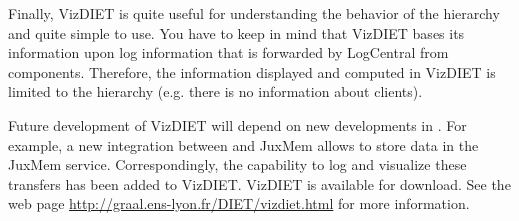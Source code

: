 Finally, VizDIET is quite useful for understanding the behavior of the
\diet hierarchy and quite simple to use. You have to keep in mind
that VizDIET bases its information upon log information that is
forwarded by LogCentral from \diet components. Therefore, the
information displayed and computed in VizDIET is limited to the \diet
hierarchy (e.g. there is no information about clients).

Future development of VizDIET will depend on new developments in \diet. For
example, a new integration between \diet and JuxMem allows \diet to store data
in the JuxMem service.  Correspondingly, the capability to log and visualize
these transfers has been added to VizDIET. VizDIET is available for
download. See the web page \url{http://graal.ens-lyon.fr/DIET/vizdiet.html} for
more information.



